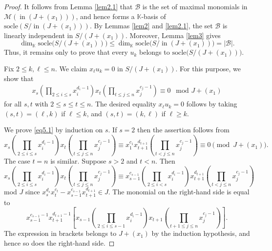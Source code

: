 \documentclass[12pt]{amsart}
\numberwithin{equation}{section}
\theoremstyle{definition}
\newcommand{\init}{\ensuremath{\mathop{\mathrm{in}}}}
\newcommand{\socle}{\mathrm{socle}}
\newcommand{\F}{\mathbb{K}}
\begin{document}
\begin{proof}
It follows from Lemma \ref{lem2.1} that
$\mathcal B$ is the set of maximal monomials in 
$\mathcal M(\init(J+(x_1)))$, and hence forms a $\F$-basis of
$\socle(S/\init(J+(x_1)))$.
By Lemmas \ref{lem2} and \ref{lem2.1},
the set $\mathcal B$ is linearly independent in $S/(J+(x_1))$.
Moreover, Lemma \ref{lem3} gives 
\[\dim_\F \mathrm{socle}\big(S/(J+(x_1))\big)\leq \dim_\F \mathrm{socle}\big(S/\init(J+(x_1))\big)=|\mathcal B|.\]
Thus, it remains only to prove that every $u_k$ belongs to $\mathrm{socle}\big(S/(J+(x_1))\big)$.

Fix $2 \leq k,\ell \leq n$.
We claim $x_\ell u_k =0$ in $S/(J+(x_1))$.
For this purpose, we show that
\begin{align}
\label{eq5.1}
x_s\left( \prod_{2 \leq i \leq s} x_i^{d_i-1} \right)
 x_t \left ( \prod_{ t \leq j \leq n} x_j^{c_j-1}\right) \equiv 0
 \ \ \mbox{ mod } J+(x_1)
\end{align}
for all $s,t$ with $2 \leq s \leq t \leq n$.
The desired equality $x_\ell u_k=0$ follows by taking
$(s,t)=(\ell,k)$ if $\ell\leq k$, and
$(s,t)=(k,\ell)$ if $\ell\geq k$.

We prove \eqref{eq5.1} by induction on $s$.
If $s=2$ then the assertion follows from
\[x_s\! \left( \prod_{2 \leq i \leq s}\! x_i^{d_i-1} \!\right)
\! x_t \!\left ( \prod_{ t \leq j \leq n} \! x_j^{c_j-1}\! \right) \! \equiv \!
 x_1^{c_1} x_{t+1}^{d_{t+1}} \! \left(\! \prod_{t <j \leq n} \! x_j^{c_j-1}\! \right) \!\equiv\! 0 \pmod {J+(x_1)}.\]
The case $t=n$ is similar.
Suppose $s>2$ and $t<n$.
Then
\[x_s\left( \prod_{2 \leq i \leq s} x_i^{d_i-1} \right)
 x_t \left ( \prod_{ t \leq j \leq n} x_j^{c_j-1}\right) \equiv
x_{s-1}^{c_{s-1}} \left( \prod_{2 \leq i < s} x_i^{d_i-1} \right)
 x_{t+1}^{d_{t+1}} \left ( \prod_{ t < j \leq n} x_j^{c_j-1}\right) 
 \]
mod $J$ since $x_s^{d_s} x_t^{c_t}-x_{s-1}^{c_{s-1}} x_{t+1}^{d_{t+1}} \in J$.
The monomial on the right-hand side is equal to
\[
x_{s-1}^{c_{s-1}-1}x_{t+1}^{d_{t+1}-1}
\left[
x_{s-1}
\left(\prod_{2\leq i\leq s-1}x_i^{d_i-1}\right)
x_{t+1}
\left(\prod_{t+1\leq j\leq n}x_j^{c_j-1}\right)
\right].
\]
The expression in brackets belongs to $J+(x_1)$ by the induction
hypothesis, and hence so does the right-hand side.
\end{proof}
\end{document}
